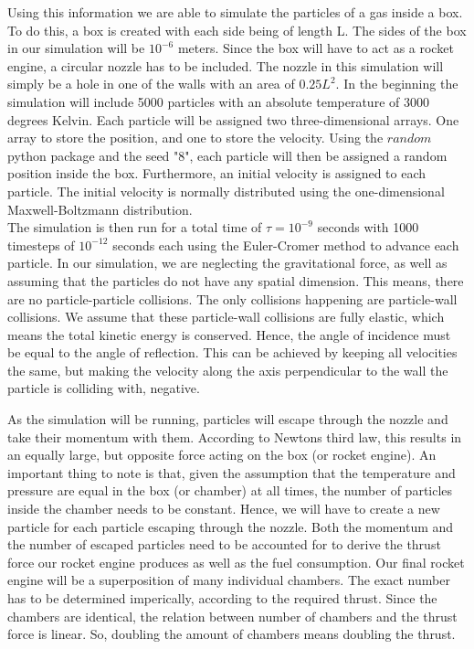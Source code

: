 \documentclass[reprint,english,notitlepage]{revtex4-2}
\begin{document}
Using this information we are able to simulate the particles of a gas inside a box.
To do this, a box is created with each side being of length L. The sides of the box in our simulation will be $10^{-6}$ meters.
Since the box will have to act as a rocket engine, a circular nozzle has to be included.
The nozzle in this simulation will simply be a hole in one of the walls with an area of $0.25L^{2}$.
In the beginning the simulation will include 5000 particles with an absolute temperature of 3000 degrees Kelvin.
Each particle will be assigned two three-dimensional arrays. One array to store the position, and one to store the velocity.
Using the $random$ python package and the seed "8", each particle will then be assigned a random position inside the box.
Furthermore, an initial velocity is assigned to each particle. The initial velocity is normally distributed using the one-dimensional Maxwell-Boltzmann distribution.\\
The simulation is then run for a total time of $\tau = 10^{-9}$ seconds with 1000 timesteps of $10^{-12}$ seconds each using the Euler-Cromer method to advance each particle.
In our simulation, we are neglecting the gravitational force, as well as assuming that the particles do not have any spatial dimension.
This means, there are no particle-particle collisions. The only collisions happening are particle-wall collisions.
We assume that these particle-wall collisions are fully elastic, which means the total kinetic energy is conserved.
Hence, the angle of incidence must be equal to the angle of reflection.
This can be achieved by keeping all velocities the same, but making the velocity along the axis perpendicular to the wall the particle is colliding with, negative.

As the simulation will be running, particles will escape through the nozzle and take their momentum with them.
According to Newtons third law, this results in an equally large, but opposite force acting on the box (or rocket engine).
An important thing to note is that, given the assumption that the temperature and pressure are equal in the box (or chamber) at all times, the number of particles inside the chamber needs to be constant.
Hence, we will have to create a new particle for each particle escaping through the nozzle.
Both the momentum and the number of escaped particles need to be accounted for to derive the thrust force our rocket engine produces as well as the fuel consumption.
Our final rocket engine will be a superposition of many individual chambers. The exact number has to be determined imperically, according to the required thrust.
Since the chambers are identical, the relation between number of chambers and the thrust force is linear.
So, doubling the amount of chambers means doubling the thrust.
\end{document}
